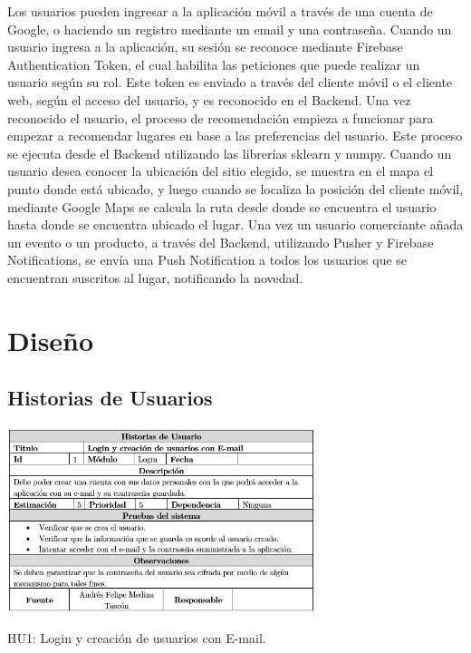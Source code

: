\documentclass[12pt,letterpaper,openany]{book}
\begin{document}
Los usuarios pueden ingresar a la aplicación móvil a través de una cuenta de Google, o haciendo un registro mediante un email y una contraseña.
\vspace{5mm}\newline
Cuando un usuario ingresa a la aplicación, su sesión se reconoce mediante Firebase Authentication Token, el cual habilita las peticiones que puede realizar un usuario según su rol. Este token es enviado a través del cliente móvil o el cliente web, según el acceso del usuario, y es reconocido en el Backend.
\vspace{5mm}\newline
Una vez reconocido el usuario, el proceso de recomendación empieza a funcionar para empezar a recomendar lugares en base a las preferencias del usuario. Este proceso se ejecuta desde el Backend utilizando las librerías sklearn y numpy.
\vspace{5mm}\newline
Cuando un usuario desea conocer la ubicación del sitio elegido, se muestra en el mapa el punto donde está ubicado, y luego cuando se localiza la posición del cliente móvil, mediante Google Maps se calcula la ruta desde donde se encuentra el usuario hasta donde se encuentra ubicado el lugar.
\vspace{5mm}\newline
Una vez un usuario comerciante añada un evento o un producto, a través del Backend, utilizando Pusher y Firebase Notifications, se envía una Push Notification a todos los usuarios que se encuentran suscritos al lugar, notificando la novedad.




\section{Diseño}
\subsection{Historias de Usuarios}
\begin{table}[H]
\centering
\includegraphics[width=9cm]{./imagenes/HU/HU1}
\caption{HU1: Login y creación de usuarios con E-mail.}
\end{table}
\end{document}
